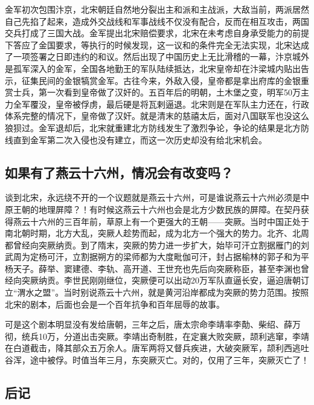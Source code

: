 \documentclass[
]{book}
\begin{document}
金军初次包围汴京，北宋朝廷自然地分裂出主和派和主战派，大敌当前，两派居然自己先掐了起来，造成外交战线和军事战线不仅没有配合，反而在相互攻击，两国交兵打成了三国大战。金军提出北宋赔偿要求，北宋在未考虑自身承受能力的前提下答应了金国要求，等执行的时候发现，这一议和的条件完全无法实现，北宋达成了一项签署之日即违约的和议。然后出现了中国历史上无比滑稽的一幕，汴京城外是孤军深入的金军，全国各地勤王的军队陆续抵达，北宋皇帝却在汴梁城内贴出告示，征集民间的金银犒赏金军。古往今来，外敌入侵，皇帝都是拿出府库的金银重赏士兵，第一次看到皇帝做了汉奸的。五百年后的明朝，土木堡之变，明军50万主力全军覆没，皇帝被俘虏，最后硬是将瓦剌逼退。北宋则是在军队主力还在，行政体系完整的情况下，皇帝做了汉奸。就是清末的慈禧太后，面对八国联军也没这么狼狈过。金军退却后，北宋就重建北方防线发生了激烈争论，争论的结果是北方防线直到金军第二次入侵也没有建立，而这一次历史却没有给北宋机会。

\hypertarget{ux5982ux679cux6709ux4e86ux71d5ux4e91ux5341ux516dux5ddeux60c5ux51b5ux4f1aux6709ux6539ux53d8ux5417}{%
\subsection{如果有了燕云十六州，情况会有改变吗？}\label{ux5982ux679cux6709ux4e86ux71d5ux4e91ux5341ux516dux5ddeux60c5ux51b5ux4f1aux6709ux6539ux53d8ux5417}}

谈到北宋，永远绕不开的一个议题就是燕云十六州，可是谁说燕云十六州必须是中原王朝的地理屏障？！有时候这燕云十六州也会是北方少数民族的屏障。在契丹获得燕云十六州的三百年前，草原上有一个更强大的王朝------突厥。当时中国正处于南北朝时期，北方大乱，突厥人趁势而起，成为北方一个强大的势力。北齐、北周都曾经向突厥纳贡。到了隋末，突厥的势力进一步扩大，始毕可汗立割据雁门的刘武周为定杨可汗，立割据朔方的梁师都为大度毗伽可汗，封占据榆林的郭子和为平杨天子。薛举、窦建德、李轨、高开道、王世充也先后向突厥称臣，甚至李渊也曾经向突厥纳贡。李世民刚刚继位，突厥便可以出动20万军队直逼长安，逼迫唐朝订立``渭水之盟''。当时别说燕云十六州，就是黄河沿岸都成为突厥的势力范围。按照北宋的剧本，后面也会是一个百年抗争和百年屈辱的故事。

可是这个剧本明显没有发给唐朝，三年之后，唐太宗命李靖率李勣、柴绍、薛万彻，统兵10万，分道出击突厥。李靖出奇制胜，在定襄大败突厥，颉利逃窜，李靖在白道截击，降其部众五万余人。唐军两将又督兵疾进，大破突厥军，颉利西逃吐谷浑，途中被俘。时值当年三月，东突厥灭亡。对的，仅用了三年，突厥灭亡了！

\hypertarget{ux540eux8bb0-3}{%
\subsection{后记}\label{ux540eux8bb0-3}}
\end{document}
